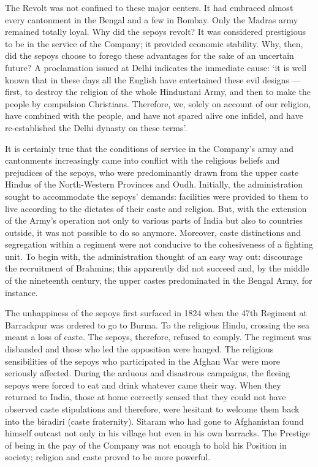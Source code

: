 The Revolt was not confined to these major centers. It had embraced almost every cantonment in the Bengal and a few in Bombay. Only the Madras army remained totally loyal. Why did the sepoys revolt? It was considered prestigious to be in the service of the Company; it provided economic stability. Why, then, did the sepoys choose to forego these advantages for the sake of an uncertain future? A proclamation issued at Delhi indicates the immediate cause: `it is well known that in these days all the English have entertained these evil designs — first, to destroy the religion of the whole Hindustani Army, and then to make the people by compulsion Christians. Therefore, we, solely on account of our religion, have combined with the people, and have not spared alive one infidel, and have re-established the Delhi dynasty on these terms'.

It is certainly true that the conditions of service in the Company's army and cantonments increasingly came into conflict with the religious beliefs and prejudices of the sepoys, who were predominantly drawn from the upper caste Hindus of the North-Western Provinces and Oudh. Initially, the administration sought to accommodate the sepoys' demands: facilities were provided to them to live according to the dictates of their caste and religion. But, with the extension of the Army's operation not only to various parts of India but also to countries outside, it was not possible to do so anymore. Moreover, caste distinctions and segregation within a regiment were not conducive to the cohesiveness of a fighting unit. To begin with, the administration thought of an easy way out: discourage the recruitment of Brahmins; this apparently did not succeed and, by the middle of the nineteenth century, the upper castes predominated in the Bengal Army, for instance.

The unhappiness of the sepoys first surfaced in 1824 when the 47th Regiment at Barrackpur was ordered to go to Burma. To the religious Hindu, crossing the sea meant a loss of caste. The sepoys, therefore, refused to comply. The regiment was disbanded and those who led the opposition were hanged. The religious sensibilities of the sepoys who participated in the Afghan War were more seriously affected. During the arduous and disastrous campaigns, the fleeing sepoys were forced to eat and drink whatever came their way. When they returned to India, those at home correctly sensed that they could not have observed caste stipulations and therefore, were hesitant to welcome them back into the biradiri (caste fraternity). Sitaram who had gone to Afghanistan found himself outcast not only in his village but even in his own barracks. The Prestige of being in the pay of the Company was not enough to hold his Position in society; religion and caste proved to be more powerful.


